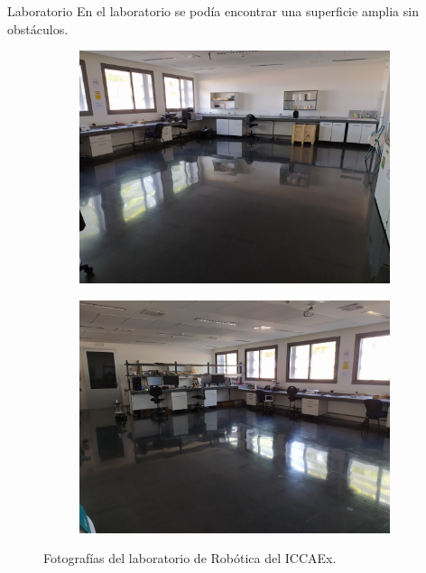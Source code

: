 \documentclass[xcolor=table]{beamer}
\begin{document}
  \begin{frame}{Laboratorio}
    En el laboratorio se podía encontrar una superficie amplia sin obstáculos.
    \begin{figure}[H]
      \begin{subfigure}[b]{.45\textwidth}
        \centering
        \includegraphics[width=\textwidth]{pic/lab1.jpg}
        \label{fig:foto_lab1}
      \end{subfigure}
      \begin{subfigure}[b]{.45\textwidth}
        \centering
        \includegraphics[width=\textwidth]{pic/lab2.jpg}
        \label{fig:foto_lab2}
      \end{subfigure}
      \caption{Fotografías del laboratorio de Robótica del ICCAEx.}
      \label{fig:foto_lab}
    \end{figure}
  \end{frame}
\end{document}
